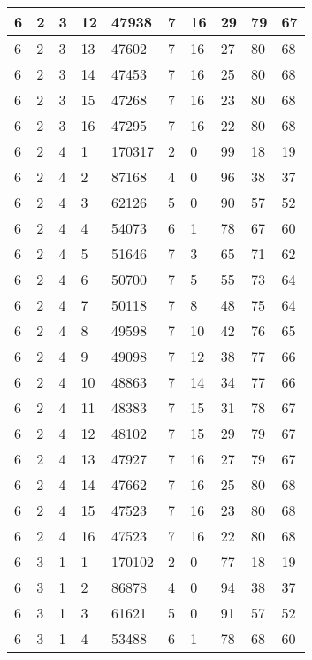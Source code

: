 \begin{table}[!ht]
\begin{tabular}{|l|l|l|l|l|l|l|l|l|l|}
        6 & 2 & 3 & 12 & 47938 & 7 & 16 & 29 & 79 & 67 \\ \hline
        6 & 2 & 3 & 13 & 47602 & 7 & 16 & 27 & 80 & 68 \\ \hline
        6 & 2 & 3 & 14 & 47453 & 7 & 16 & 25 & 80 & 68 \\ \hline
        6 & 2 & 3 & 15 & 47268 & 7 & 16 & 23 & 80 & 68 \\ \hline
        6 & 2 & 3 & 16 & 47295 & 7 & 16 & 22 & 80 & 68 \\ \hline
        6 & 2 & 4 & 1 & 170317 & 2 & 0 & 99 & 18 & 19 \\ \hline
        6 & 2 & 4 & 2 & 87168 & 4 & 0 & 96 & 38 & 37 \\ \hline
        6 & 2 & 4 & 3 & 62126 & 5 & 0 & 90 & 57 & 52 \\ \hline
        6 & 2 & 4 & 4 & 54073 & 6 & 1 & 78 & 67 & 60 \\ \hline
        6 & 2 & 4 & 5 & 51646 & 7 & 3 & 65 & 71 & 62 \\ \hline
        6 & 2 & 4 & 6 & 50700 & 7 & 5 & 55 & 73 & 64 \\ \hline
        6 & 2 & 4 & 7 & 50118 & 7 & 8 & 48 & 75 & 64 \\ \hline
        6 & 2 & 4 & 8 & 49598 & 7 & 10 & 42 & 76 & 65 \\ \hline
        6 & 2 & 4 & 9 & 49098 & 7 & 12 & 38 & 77 & 66 \\ \hline
        6 & 2 & 4 & 10 & 48863 & 7 & 14 & 34 & 77 & 66 \\ \hline
        6 & 2 & 4 & 11 & 48383 & 7 & 15 & 31 & 78 & 67 \\ \hline
        6 & 2 & 4 & 12 & 48102 & 7 & 15 & 29 & 79 & 67 \\ \hline
        6 & 2 & 4 & 13 & 47927 & 7 & 16 & 27 & 79 & 67 \\ \hline
        6 & 2 & 4 & 14 & 47662 & 7 & 16 & 25 & 80 & 68 \\ \hline
        6 & 2 & 4 & 15 & 47523 & 7 & 16 & 23 & 80 & 68 \\ \hline
        6 & 2 & 4 & 16 & 47523 & 7 & 16 & 22 & 80 & 68 \\ \hline
        6 & 3 & 1 & 1 & 170102 & 2 & 0 & 77 & 18 & 19 \\ \hline
        6 & 3 & 1 & 2 & 86878 & 4 & 0 & 94 & 38 & 37 \\ \hline
        6 & 3 & 1 & 3 & 61621 & 5 & 0 & 91 & 57 & 52 \\ \hline
        6 & 3 & 1 & 4 & 53488 & 6 & 1 & 78 & 68 & 60 \\ \hline

\end{tabular}
\end{table}

